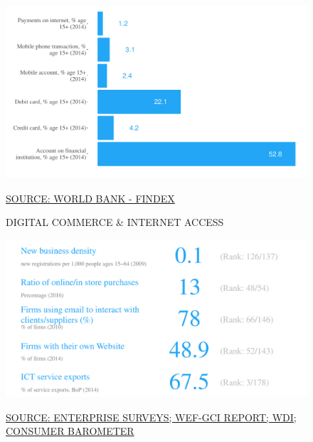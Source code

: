 \documentclass{article}\usepackage[]{graphicx}\usepackage[]{color}
\makeatletter
\def\maxwidth{ %
  \ifdim\Gin@nat@width>\linewidth
    \linewidth
  \else
    \Gin@nat@width
  \fi
}
\makeatother
\begin{document}
\begin{figure}
\begin{minipage}[c]{0.95\textwidth}
\begin{minipage}[b]{0.95\textwidth}
\begin{minipage}[c]{0.48\textwidth}
{\centering \includegraphics[width=\maxwidth]{figure/bar_chart_Markets-1} 

}



      \vspace*{-0.1cm} 
      \scriptsize{\href{NA}{\textcolor[HTML]{22A6F5}{SOURCE: WORLD BANK - FINDEX}}}
    \end{minipage}
    \begin{minipage}[c]{0.48\textwidth} %
      \small{\textcolor[HTML]{818181}{DIGITAL COMMERCE \& INTERNET ACCESS}}
      \vspace{1ex}


{\centering \includegraphics[width=\maxwidth]{figure/number_chart_Markets-1} 

}



      \vspace{2ex}
      \hspace{4ex}\scriptsize{\href{NA}{\textcolor[HTML]{22A6F5}{SOURCE: ENTERPRISE SURVEYS; WEF-GCI REPORT; WDI; CONSUMER BAROMETER}}}
    \end{minipage}
  \end{minipage}  


\end{minipage}
\end{figure}
\end{document}
